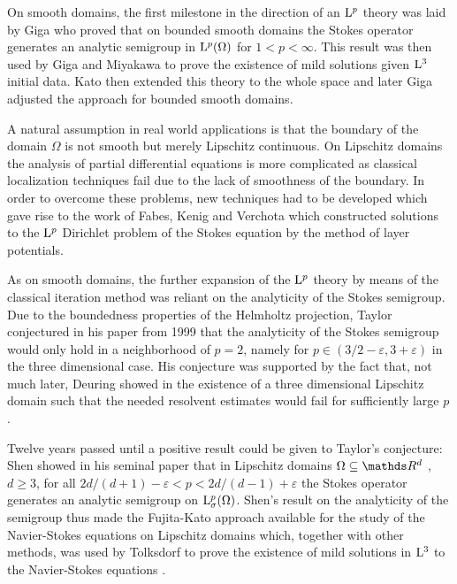 On smooth domains, the first milestone in the direction of an $\mathrm{L}^p$ theory was laid by Giga \cite{giga} who proved that on bounded smooth domains the Stokes operator generates an analytic semigroup in $\mathrm{L}^p(\Omega)$ for $1 < p < \infty$.
This result was then used by Giga and Miyakawa \cite{gigaMiyakawa} to prove the existence of mild solutions given $\mathrm{L}^3$ initial data.
Kato \cite{katoExtend} then extended this theory to the whole space and later Giga \cite{gigaAdjust} adjusted the approach for bounded smooth domains.

A natural assumption in real world applications is that the boundary of the domain $\Omega$ is not smooth but merely Lipschitz continuous. 
On Lipschitz domains the analysis of partial differential equations is more complicated as classical localization techniques fail due to the lack of smoothness of the boundary.
In order to overcome these problems, new techniques had to be developed which gave rise to the work of Fabes, Kenig and Verchota \cite{fabesKenigVerchota} which constructed solutions to the $\mathrm{L}^p$ Dirichlet problem of the Stokes equation by the method of layer potentials.

As on smooth domains, the further expansion of the $\mathrm{L}^p$ theory by means of the classical iteration method was reliant on the analyticity of the Stokes semigroup.
Due to the boundedness properties of the Helmholtz projection, Taylor conjectured in his paper \cite{taylor} from 1999 that the analyticity of the Stokes semigroup would only hold in a neighborhood of $p = 2$, namely for $p \in  (3/2 - \varepsilon, 3 + \varepsilon)$ in the three dimensional case.
His conjecture was supported by the fact that, not much later, Deuring showed in \cite{deuring} the existence of a three dimensional Lipschitz domain such that the needed resolvent estimates would fail for sufficiently large $p$.

Twelve years passed until a positive result could be given to Taylor's conjecture:  Shen showed in his seminal paper \cite{Shen2012} that in Lipschitz domains $\Omega \subseteq \R^d$ , $d \geq 3$, for all $2d/( d + 1) - \varepsilon < p < 2d/(d - 1) + \varepsilon$ the Stokes operator generates an analytic semigroup on $\mathrm{L}^p_\sigma(\Omega)$.
Shen's result on the analyticity of the semigroup thus made the Fujita-Kato approach available for the study of the Navier-Stokes equations on Lipschitz domains which, together with other methods, was used by Tolksdorf to prove the existence of mild solutions in $\mathrm{L}^3$ to the Navier-Stokes equations \cite{tolksdorf}.

